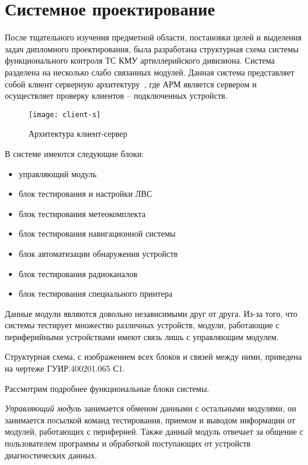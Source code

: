 \section{Системное проектирование}
\label{sec:arch}

После тщательного изучения предметной области, постановки целей и выделения задач дипломного проектирования, была
разработана структурная схема системы функционального контроля ТС КМУ артиллерийского дивизиона.
Система разделена на несколько слабо связанных модулей.
Данная система представляет собой клиент серверную архитектуру~\cite{cl_s},
где АРМ является сервером и осуществляет проверку клиентов -- подключенных устройств.

\begin{figure}[ht]
	\centering
	\texttt{[image: client-s]}
	\caption{Архитектура клиент-сервер~\cite{cl_s}}
	\label{fig:sec_arch:client}
\end{figure}

В системе имеются следующие блоки:
\begin{itemize}
	\item управляющий модуль
	\item блок тестирования и настройки ЛВС
	\item блок тестирования метеокомплекта
	\item блок тестирования навигационной системы
	\item блок автоматизации обнаружения устройств
	\item блок тестирования радиоканалов
	\item блок тестирования специального принтера
\end{itemize}

Данные модули являются довольно независимыми друг от друга. Из-за того, что системы тестирует множество различных
устройств, модули, работающие с периферийными устройствами имеют связь лишь с управляющим модулем.

Структурная схема, с изображением всех блоков и связей между ними, приведена на чертеже ГУИР.400201.065 С1.

Рассмотрим подробнее функциональные блоки системы.

\textit{Управляющий модуль} занимается обменом данными с остальными модулями, он занимается посылкой команд
тестирования, приемом и выводом информации от модулей, работающих с периферией. Также данный модуль отвечает за общение
с пользователем программы и обработкой поступающих от устройств диагностических данных.

